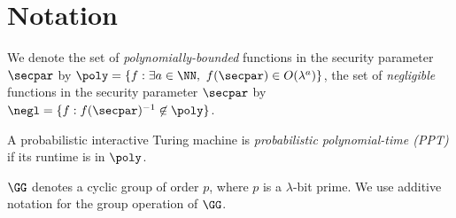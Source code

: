 \section{Notation}
We denote the set of \emph{polynomially-bounded} functions in the security parameter $\secpar$ by $\poly = \{ f : \exists a \in \NN,\ f(\secpar) \in O(\lambda^a) \}$, the set of \emph{negligible} functions in the security parameter $\secpar$ by $\negl = \{ f : f(\secpar)^{-1} \not\in \poly \}$.

A probabilistic interactive Turing machine is \emph{probabilistic polynomial-time (PPT)} if its runtime is in $\poly$.

$\GG$ denotes a cyclic group of order $p$, where $p$ is a $\lambda$-bit prime.
We use additive notation for the group operation of $\GG$.